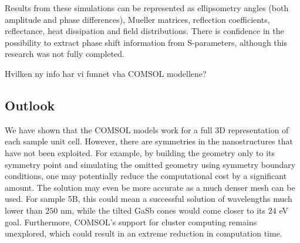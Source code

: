 Results from these simulations can be represented as ellipsometry angles (both amplitude and phase differences), Mueller matrices, reflection coefficients, reflectance, heat dissipation and field distributions. There is confidence in the possibility to extract phase shift information from S-parameters, although this research was not fully completed.

Hvilken ny info har vi funnet vha COMSOL modellene?

\subsection*{Outlook}

We have shown that the COMSOL models work for a full 3D representation of each sample unit cell. However, there are symmetries in the nanostructures that have not been exploited. For example, by building the geometry only to its symmetry point and simulating the omitted geometry using symmetry boundary conditions, one may potentially reduce the computational cost by a significant amount. The solution may even be more accurate as a much denser mesh can be used. For sample 5B, this could mean a successful solution of wavelengths much lower than $250$ nm, while the tilted GaSb cones would come closer to its $24$ eV goal. Furthermore, COMSOL's support for cluster computing remains unexplored, which could result in an extreme reduction in computation time. %


\cleardoublepage